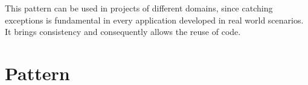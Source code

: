 \documentclass[12pt]{article}
\begin{document}
This pattern can be used in projects of different domains, since catching exceptions is fundamental in every application developed in real world scenarios. It brings consistency and consequently allows the reuse of code.




\section{Pattern}
\end{document}
